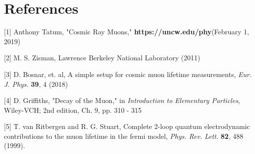 \documentclass{article}
\begin{document}
 






 
 
\section*{References}

\hspace{4mm} [1] \hspace{1mm}  Anthony Tatum, "Cosmic Ray Muons," \textbf{https://uncw.edu/phy}\newline (February 1, 2019)

\vspace{3mm}

[2] \hspace{1mm} M. S. Zisman, Lawrence Berkeley National Laboratory (2011)

\vspace{3 mm}



[3] \hspace{1mm}  D. Bosnar, et. al, A simple setup for cosmic muon lifetime measurements, \textit{Eur. J. Phys.} \textbf{39}, 4 (2018)
\vspace{3 mm}

[4] \hspace{1mm} D. Griffiths, "Decay of the Muon," in \textit{Introduction to Elementary Particles}, Wiley-VCH; 2nd edition, Ch. 9, pp. 310 - 315

\vspace{3 mm}

[5] \hspace{1mm} T. van Ritbergen and R. G. Stuart, Complete 2-loop quantum electrodynamic contributions to the muon lifetime in the fermi model, \textit{Phys. Rev. Lett.} \textbf{82}, 488 (1999).
\end{document}
